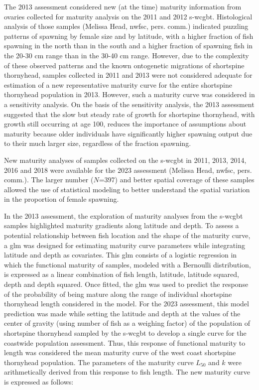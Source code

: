 \documentclass[11pt,
  english,
  letterpaper,
]{article}
\begin{document}
The 2013 assessment considered new (at the time) maturity information from ovaries collected for maturity analysis on the 2011 and 2012 \gls{s-wcgbt}. Histological analysis of those samples (Melissa Head, \gls{nwfsc}, pers. comm.) indicated puzzling patterns of spawning by female size and by latitude, with a higher fraction of fish spawning in the north than in the south and a higher fraction of spawning fish in the 20-30 cm range than in the 30-40 cm range. However, due to the complexity of these observed patterns and the known ontogenetic migrations of shortspine thornyhead, samples collected in 2011 and 2013 were not considered adequate for estimation of a new representative maturity curve for the entire shortspine thornyhead population in 2013. However, such a maturity curve was considered in a sensitivity analysis. On the basis of the sensitivity analysis, the 2013 assessment suggested that the slow but steady rate of growth for shortspine thornyhead, with growth still occurring at age 100, reduces the importance of assumptions about maturity because older individuals have significantly higher spawning output due to their much larger size, regardless of the fraction spawning.

New maturity analyses of samples collected on the \gls{s-wcgbt} in 2011, 2013, 2014, 2016 and 2018 were available for the 2023 assessment (Melissa Head, \gls{nwfsc}, pers. comm.). The larger number (\(N\)=397) and better spatial coverage of these samples allowed the use of statistical modeling to better understand the spatial variation in the proportion of female spawning.

In the 2013 assessment, the exploration of maturity analyses from the \gls{s-wcgbt} samples highlighted maturity gradients along latitude and depth. To assess a potential relationship between fish location and the shape of the maturity curve, a \gls{glm} was designed for estimating maturity curve parameters while integrating latitude and depth as covariates. This \gls{glm} consists of a logistic regression in which the functional maturity of samples, modeled with a Bernoulli distribution, is expressed as a linear combination of fish length, latitude, latitude squared, depth and depth squared. Once fitted, the \gls{glm} was used to predict the response of the probability of being mature along the range of individual shortspine thornyhead length considered in the model. For the 2023 assessment, this model prediction was made while setting the latitude and depth at the values of the center of gravity (using number of fish as a weighing factor) of the population of shortspine thornyhead sampled by the \gls{s-wcgbt} to develop a single curve for the coastwide population assessment. Thus, this response of functional maturity to length was considered the mean maturity curve of the west coast shortspine thornyhead population. The parameters of the maturity curve \(L_{50}\) and \(k\) were arithmetically derived from this response to fish length. The new maturity curve is expressed as follows:
\end{document}
